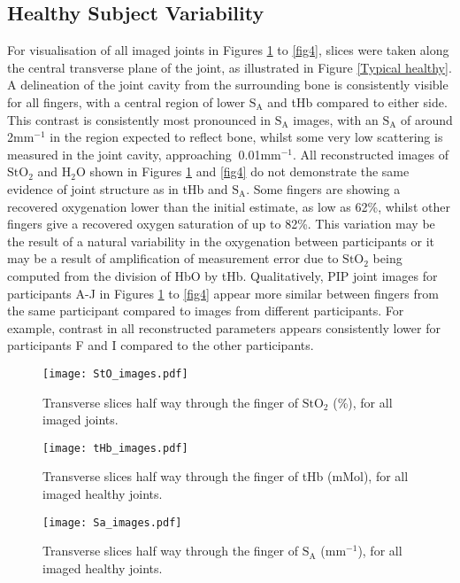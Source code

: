 \documentclass[twoside]{bhamthesis}
\theoremstyle{definition}
\begin{document}
\subsection{Healthy Subject Variability}

For visualisation of all imaged joints in Figures \ref{fig1} to \ref{fig4}, slices were taken along the central transverse plane of the joint, as illustrated in Figure \ref{Typical healthy}. A delineation of the joint cavity from the surrounding bone is consistently visible for all fingers, with a central region of lower $\mathrm{S_A}$ and tHb compared to either side. This contrast is consistently most pronounced in $\mathrm{S_A}$ images, with an $\mathrm{S_A}$ of around 2mm$^{-1}$ in the region expected to reflect bone, whilst some very low scattering is measured in the joint cavity, approaching $~$0.01mm$^{-1}$. All reconstructed images of $\mathrm{StO_2}$ and $\mathrm{H_2O}$ shown in Figures \ref{fig1} and \ref{fig4} do not demonstrate the same evidence of joint structure as in tHb and $\mathrm{S_A}$. Some fingers are showing a recovered oxygenation lower than the initial estimate, as low as 62\%, whilst other fingers give a recovered oxygen saturation of up to 82\%. This variation may be the result of a natural variability in the oxygenation between participants or it may be a result of amplification of measurement error due to $\mathrm{StO_2}$ being computed from the division of HbO by tHb. Qualitatively, PIP joint images for participants A-J in Figures \ref{fig1} to \ref{fig4} appear more similar between fingers from the same participant compared to images from different participants. For example, contrast in all reconstructed parameters appears consistently lower for participants F and I compared to the other participants.

\begin{figure}[!ht]
\centering\texttt{[image: StO\_images.pdf]}
\caption{Transverse slices half way through the finger of $\mathrm{StO_2}$ (\%), for all imaged joints.}
\label{fig1}
\end{figure}

\begin{figure}[!ht]
\centering\texttt{[image: tHb\_images.pdf]}
\caption{Transverse slices half way through the finger of tHb (mMol), for all imaged healthy joints.}
\label{fig2}
\end{figure}

\begin{figure}[!ht]
\centering\texttt{[image: Sa\_images.pdf]}
\caption{Transverse slices half way through the finger of $\mathrm{S_A}$ (mm$^{-1}$), for all imaged healthy joints.}
\label{fig3}
\end{figure}
\end{document}
